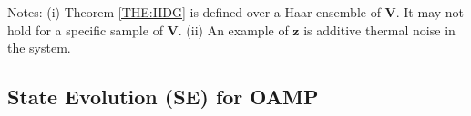 \documentclass[journal]{IEEEtran}
\newcommand{\mr}{\mathrm}
\newcommand{\BE}{\begin{equation}}
\newcommand{\EE}{\end{equation}}
\renewcommand{\bf}{\bm}
\renewcommand{\cal}{\mathcal}
\begin{document}




Notes: (i) Theorem \ref{THE:IIDG} is defined over a Haar ensemble of $\bf{V}$.  It may not hold for a specific sample of $\bf{V}$. (ii) An example of $\bf{z}$ is additive thermal noise in the system. 


\subsection{State Evolution (SE) for OAMP}\label{Sec:SE} 
 
 
\end{document}
